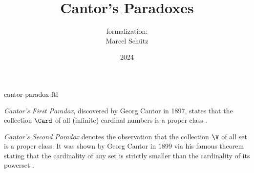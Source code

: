\documentclass{article}
\title{Cantor's Paradoxes}
\author{\Naproche formalization: \\[0.5em]Marcel Schütz}
\date{2024}
\begin{document}
\begin{smodule}{cantor-paradox-ftl}
  \maketitle
  \hidetlsnumbers


  \noindent \emph{Cantor's First Paradox}, discovered by Georg Cantor in 1897,
  states that the collection $\Card$ of all (infinite) cardinal numbers is a
  proper class \cite[chapter 156]{Cantor1991}.


  \emph{Cantor's Second Paradox} denotes the observation that the collection
  $\V$ of all set is a proper class.
  It was shown by Georg Cantor in 1899 via his famous theorem stating that the
  cardinality of any set is strictly smaller than the cardinality of its 
  powerset \cite[chapter 163]{Cantor1991}.


  \printbibliography
\end{smodule}
\end{document}
